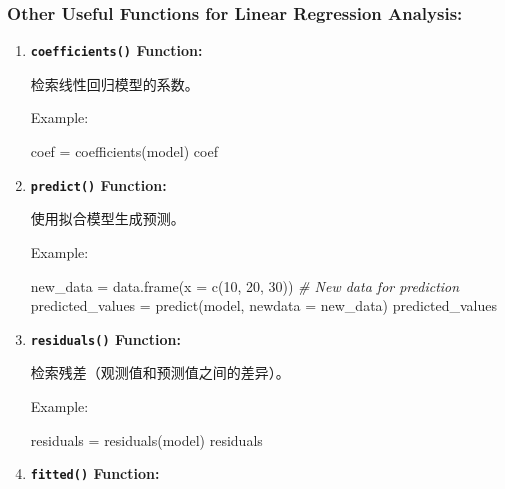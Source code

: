 \documentclass[
]{article}
\newenvironment{Shaded}{}{}
\newcommand{\AttributeTok}[1]{\textcolor[rgb]{0.49,0.56,0.16}{#1}}
\newcommand{\CommentTok}[1]{\textcolor[rgb]{0.38,0.63,0.69}{\textit{#1}}}
\newcommand{\DecValTok}[1]{\textcolor[rgb]{0.25,0.63,0.44}{#1}}
\newcommand{\FunctionTok}[1]{\textcolor[rgb]{0.02,0.16,0.49}{#1}}
\newcommand{\NormalTok}[1]{#1}
\newcommand{\OtherTok}[1]{\textcolor[rgb]{0.00,0.44,0.13}{#1}}
\begin{document}
\hypertarget{other-useful-functions-for-linear-regression-analysis}{%
\subsubsection{Other Useful Functions for Linear Regression
Analysis:}\label{other-useful-functions-for-linear-regression-analysis}}

\begin{enumerate}
\def\labelenumi{\arabic{enumi}.}
\item
  \textbf{\texttt{coefficients()} Function:}

  检索线性回归模型的系数。

  Example:

\begin{Shaded}
\begin{Highlighting}[]
\NormalTok{coef }\OtherTok{=} \FunctionTok{coefficients}\NormalTok{(model)}
\NormalTok{coef}
\end{Highlighting}
\end{Shaded}
\item
  \textbf{\texttt{predict()} Function:}

  使用拟合模型生成预测。

  Example:

\begin{Shaded}
\begin{Highlighting}[]
\NormalTok{new\_data }\OtherTok{=} \FunctionTok{data.frame}\NormalTok{(}\AttributeTok{x =} \FunctionTok{c}\NormalTok{(}\DecValTok{10}\NormalTok{, }\DecValTok{20}\NormalTok{, }\DecValTok{30}\NormalTok{))  }\CommentTok{\# New data for prediction}
\NormalTok{predicted\_values }\OtherTok{=} \FunctionTok{predict}\NormalTok{(model, }\AttributeTok{newdata =}\NormalTok{ new\_data)}
\NormalTok{predicted\_values}
\end{Highlighting}
\end{Shaded}
\item
  \textbf{\texttt{residuals()} Function:}

  检索残差（观测值和预测值之间的差异）。

  Example:

\begin{Shaded}
\begin{Highlighting}[]
\NormalTok{residuals }\OtherTok{=} \FunctionTok{residuals}\NormalTok{(model)}
\NormalTok{residuals}
\end{Highlighting}
\end{Shaded}
\item
  \textbf{\texttt{fitted()} Function:}


\end{enumerate}
\end{document}
